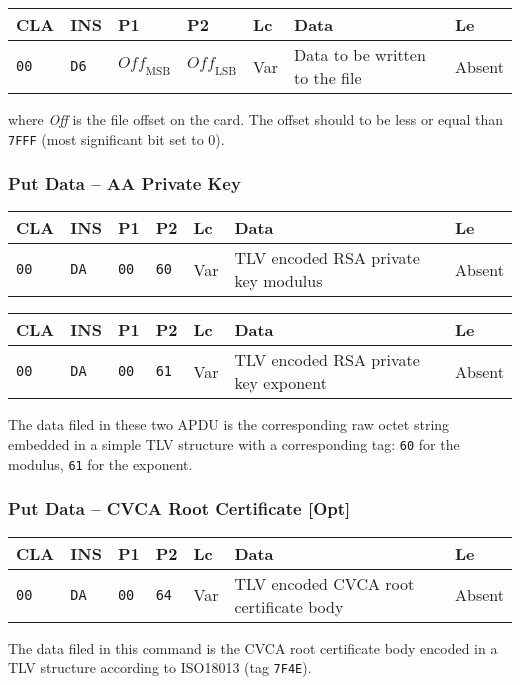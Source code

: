 \documentclass{article}
\begin{document}
\begin{flushleft}
\begin{tabular}{|l|l|l|l|l|l|l|}
\hline
CLA & INS & P1 & P2 & Lc & Data & Le \\
\hline
\texttt{00} & \texttt{D6} &
$\mathit{Off}_{\mathrm{MSB}}$ & $\mathit{Off}_{\mathrm{LSB}}$ &
Var & Data to be written to the file & Absent \\
\hline
\end{tabular}
\end{flushleft}
where \textit{Off} is the file offset on the card. The offset should
to be less or equal than \texttt{7FFF} (most significant bit set to
0).

\subsubsection{Put Data -- AA Private Key}

\begin{flushleft}
\begin{tabular}{|l|l|l|l|l|l|l|}
\hline
CLA & INS & P1 & P2 & Lc & Data & Le \\
\hline
\texttt{00} & \texttt{DA} & \texttt{00} & \texttt{60} &
Var & TLV encoded RSA private key modulus & Absent \\
\hline
\end{tabular}

\medskip

\begin{tabular}{|l|l|l|l|l|l|l|}
\hline
CLA & INS & P1 & P2 & Lc & Data & Le \\
\hline
\texttt{00} & \texttt{DA} & \texttt{00} & \texttt{61} &
Var & TLV encoded RSA private key exponent & Absent \\
\hline
\end{tabular}
\end{flushleft}
The data filed in these two APDU is the corresponding raw octet string
embedded in a simple TLV structure with a corresponding tag:
\texttt{60} for the modulus, \texttt{61} for the exponent.

\subsubsection{Put Data -- CVCA Root Certificate [Opt]}

\begin{flushleft}
\begin{tabular}{|l|l|l|l|l|l|l|}
\hline
CLA & INS & P1 & P2 & Lc & Data & Le \\
\hline
\texttt{00} & \texttt{DA} & \texttt{00} & \texttt{64} &
Var & TLV encoded CVCA root certificate body & Absent \\
\hline
\end{tabular}
\end{flushleft}
The data filed in this command is the CVCA root certificate body
encoded in a TLV structure according to ISO18013 (tag \texttt{7F4E}).
\end{document}
